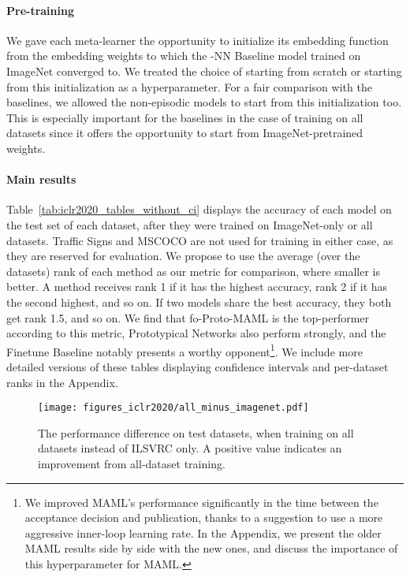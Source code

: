 \documentclass{article} \usepackage{iclr2020_conference,times}
\begin{document}
\paragraph{Pre-training} We gave each meta-learner the opportunity to initialize its embedding function from the
embedding weights to which the -NN Baseline model trained on ImageNet
converged to. We treated the choice of starting from scratch or starting from this initialization as a hyperparameter. For a fair comparison with the baselines, we allowed the non-episodic models to start from this initialization too. This is especially important for the baselines in the case of training on all datasets since it offers the opportunity to start from ImageNet-pretrained weights. 



\paragraph{Main results} Table~\ref{tab:iclr2020_tables_without_ci} displays the accuracy of each model on the test set of each dataset, after they were trained on
ImageNet-only or all datasets. Traffic Signs and MSCOCO are not used for training
in either case, as they are reserved for evaluation. 
We propose to use the average (over the datasets) rank of each method as our metric for
comparison, where smaller is better. A method receives rank 1 if it has the
highest accuracy, rank 2 if it has the second highest, and so on. If two models share the best accuracy, they both get rank 1.5, and so on. We find that fo-Proto-MAML is the top-performer according to this metric, Prototypical Networks also perform strongly, and the Finetune Baseline notably presents a worthy opponent\footnote{We improved MAML's performance significantly in the time between the acceptance decision and publication, thanks to a suggestion to use a more aggressive inner-loop learning rate. In the Appendix, we present the older MAML results side by side with the new ones, and discuss the importance of this hyperparameter for MAML.}. We include more detailed versions of these tables displaying confidence intervals and per-dataset ranks in the Appendix. 

\begin{figure*}[h]
\centering
    \texttt{[image: figures\_iclr2020/all\_minus\_imagenet.pdf]}
  \caption{The performance difference on test datasets, when training on all datasets instead of ILSVRC only. A positive value indicates an improvement from all-dataset training.}
  \label{fig:trainsource_diff}
\end{figure*}
\end{document}
